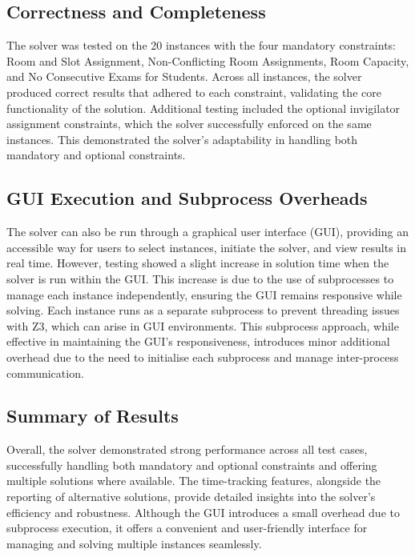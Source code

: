 \documentclass[a4paper]{article}
\begin{document}
    \subsection{Correctness and Completeness}
    The solver was tested on the 20 instances with the four mandatory constraints: Room and Slot Assignment, Non-Conflicting Room Assignments, Room Capacity, and No Consecutive Exams for Students. Across all instances, the solver produced correct results that adhered to each constraint, validating the core functionality of the solution. Additional testing included the optional invigilator assignment constraints, which the solver successfully enforced on the same instances. This demonstrated the solver's adaptability in handling both mandatory and optional constraints.
    
    \subsection{GUI Execution and Subprocess Overheads}
    The solver can also be run through a graphical user interface (GUI), providing an accessible way for users to select instances, initiate the solver, and view results in real time. However, testing showed a slight increase in solution time when the solver is run within the GUI. This increase is due to the use of subprocesses to manage each instance independently, ensuring the GUI remains responsive while solving. Each instance runs as a separate subprocess to prevent threading issues with Z3, which can arise in GUI environments. This subprocess approach, while effective in maintaining the GUI’s responsiveness, introduces minor additional overhead due to the need to initialise each subprocess and manage inter-process communication.
    
    \subsection{Summary of Results}
    Overall, the solver demonstrated strong performance across all test cases, successfully handling both mandatory and optional constraints and offering multiple solutions where available. The time-tracking features, alongside the reporting of alternative solutions, provide detailed insights into the solver’s efficiency and robustness. Although the GUI introduces a small overhead due to subprocess execution, it offers a convenient and user-friendly interface for managing and solving multiple instances seamlessly.    
\end{document}
